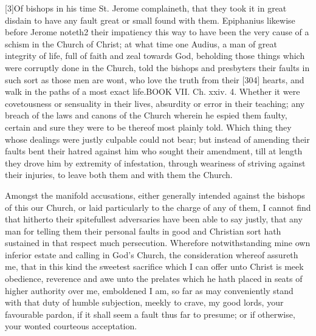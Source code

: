 [3]Of bishops in his time St. Jerome complaineth, that they took it in great disdain to have any fault great or small found with them. Epiphanius likewise before Jerome noteth2 their impatiency this way to have been the very cause of a schism in the Church of Christ; at what time one Audius, a man of great integrity of life, full of faith and zeal towards God, beholding those things which were corruptly done in the Church, told the bishops and presbyters their faults in such sort as those men are wont, who love the truth from their [304] hearts, and walk in the paths of a most exact life.BOOK VII. Ch. xxiv. 4. Whether it were covetousness or sensuality in their lives, absurdity or error in their teaching; any breach of the laws and canons of the Church wherein he espied them faulty, certain and sure they were to be thereof most plainly told. Which thing they whose dealings were justly culpable could not bear; but instead of amending their faults bent their hatred against him who sought their amendment, till at length they drove him by extremity of infestation, through weariness of striving against their injuries, to leave both them and with them the Church.

Amongst the manifold accusations, either generally intended against the bishops of this our Church, or laid particularly to the charge of any of them, I cannot find that hitherto their spitefullest adversaries have been able to say justly, that any man for telling them their personal faults in good and Christian sort hath sustained in that respect much persecution. Wherefore notwithstanding mine own inferior estate and calling in God’s Church, the consideration whereof assureth me, that in this kind the sweetest sacrifice which I can offer unto Christ is meek obedience, reverence and awe unto the prelates which he hath placed in seats of higher authority over me, emboldened I am, so far as may conveniently stand with that duty of humble subjection, meekly to crave, my good lords, your favourable pardon, if it shall seem a fault thus far to presume; or if otherwise, your wonted courteous acceptation.

